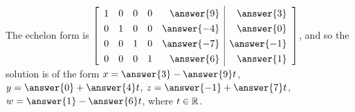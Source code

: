 \documentclass{ximera}
\begin{document}
\begin{problem}
\begin{enumerate}
        The echelon form is 
        $\def\arraystretch{1.3}
        \startmat{rrrrr|r}
        1 & 0 & 0 & 0 & \answer{9} & \answer{3} \\
        0 & 1 & 0 & 0 & \answer{-4} & \answer{0} \\
        0 & 0 & 1 & 0 & \answer{-7} & \answer{-1} \\
        0 & 0 & 0 & 1 & \answer{6} & \answer{1}
        \stopmat$, and so the solution is of the form $x=\answer{3}-\answer{9}t$, $y=\answer{0}+\answer{4}t$, $z=\answer{-1}+\answer{7}t$, $w=\answer{1}-\answer{6}t$, where $t\in \mathbb{R}$.
        
    \end{enumerate}
    

\end{problem}
\end{document}
